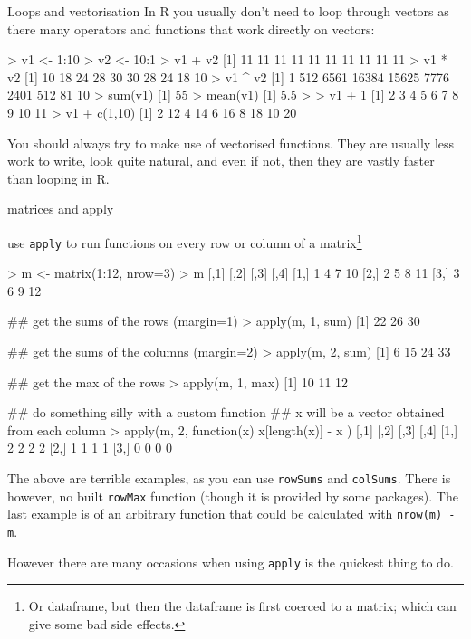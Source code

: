 \documentclass[pdf]{beamer}
\begin{document}
\begin{frame}[fragile]{Loops and vectorisation}
  In R you usually don't need to loop through vectors as there many operators
  and functions that work directly on vectors:

  \begin{rcode}
    > v1 <- 1:10
    > v2 <- 10:1
    > v1 + v2
    [1] 11 11 11 11 11 11 11 11 11 11
    > v1 * v2
    [1] 10 18 24 28 30 30 28 24 18 10
    > v1 ^ v2
    [1]     1   512  6561 16384 15625  7776  2401   512    81    10
    > sum(v1)
    [1] 55
    > mean(v1)
    [1] 5.5
    > 
    > v1 + 1
    [1]  2  3  4  5  6  7  8  9 10 11
    > v1 + c(1,10)
    [1]  2 12  4 14  6 16  8 18 10 20
  \end{rcode}
  
  You should always try to make use of vectorised functions. They are usually
  less work to write, look quite natural, and even if not, then they are
  vastly faster than looping in R.
\end{frame}

\begin{frame}[fragile]{matrices and apply}
  
  {\small
  use \texttt{apply} to run functions on every row or column
  of a matrix\footnote{Or dataframe, but then the dataframe is first
  coerced to a matrix; which can give some bad side effects.}
  }
  \begin{rcode}
    > m <- matrix(1:12, nrow=3)
    > m
    [,1] [,2] [,3] [,4]
    [1,]    1    4    7   10
    [2,]    2    5    8   11
    [3,]    3    6    9   12
    
    ## get the sums of the rows (margin=1)
    > apply(m, 1, sum)
    [1] 22 26 30
    
    ## get the sums of the columns (margin=2)
    > apply(m, 2, sum)
    [1]  6 15 24 33
    
    ## get the max of the rows
    > apply(m, 1, max)
    [1] 10 11 12
    
    ## do something silly with a custom function
    ## x will be a vector obtained from each column
    > apply(m, 2, function(x){ x[length(x)] - x })
        [,1] [,2] [,3] [,4]
    [1,]    2    2    2    2
    [2,]    1    1    1    1
    [3,]    0    0    0    0
  \end{rcode}
  {\footnotesize
  The above are terrible examples, as you can use \texttt{rowSums} and
  \texttt{colSums}. There is however, no built \texttt{rowMax} function 
  (though it is provided by some packages). The last example is of an
  arbitrary function that could be calculated with \texttt{nrow(m) - m}.

  However there are many occasions when using \texttt{apply} is the quickest
  thing to do.
  }
\end{frame}
\end{document}
